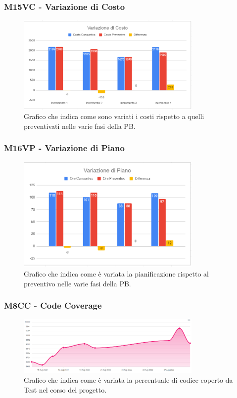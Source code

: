 \subsubsection{M15VC - Variazione di Costo}
\begin{figure}[H]
    \centering\includegraphics[width=0.8\textwidth, height=0.8\textheight,keepaspectratio]{images/PB-Variazione-di-Costo-2.png}
    \caption{Grafico che indica come sono variati i costi rispetto a quelli preventivati nelle varie fasi della PB.}
\end{figure}    

\subsubsection{M16VP - Variazione di Piano}
\begin{figure}[H]
    \centering\includegraphics[width=0.8\textwidth, height=0.8\textheight,keepaspectratio]{images/PB-Variazione-di-Piano-2.png}
    \caption{Grafico che indica come è variata la pianificazione rispetto al preventivo nelle varie fasi della PB.}
\end{figure}  

\subsubsection{M8CC - Code Coverage}
\begin{figure}[H]
    \centering\includegraphics[width=0.8\textwidth, height=0.8\textheight,keepaspectratio]{images/PB-Code-Coverage.png}
    \caption{Grafico che indica come è variata la percentuale di codice coperto da Test nel corso del progetto.}
\end{figure}  
